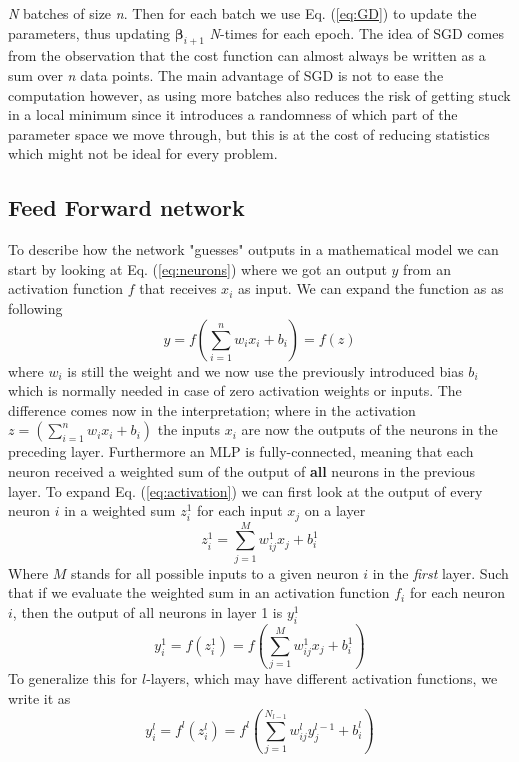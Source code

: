 \documentclass[14pt, a4paper]{book}
\begin{document}
\textit{N} batches of size \textit{n}. Then for each batch we use Eq. (\ref{eq:GD}) to update the parameters, thus updating $\bm{\beta}_{i+1}$ \textit{N}-times for each epoch. The idea of SGD comes from the observation that the 
cost function can almost always be written as a sum over \textit{n} data points. The main advantage of SGD is not to ease the computation however, as using more batches also reduces the risk of getting stuck in a local minimum since it introduces a randomness of which part of the parameter space we move through, 
but this is at the cost of reducing statistics which might not be ideal for every problem.


\subsection{Feed Forward network}\label{sec:FFN}
To describe how the network "guesses" outputs in a mathematical model we can start by looking at Eq. (\ref{eq:neurons}) where we got an output $y$ from an activation function $f$ that receives $x_i$ as input. 
We can expand the function as as following
\begin{equation}\label{eq:activation}
    y=f\left(\sum_{i=1}^nw_ix_i+b_i\right)=f(z)
\end{equation} 
where $w_i$ is still the weight and we now use the previously introduced bias $b_i$ which is normally needed in case of zero activation weights or inputs. The difference comes now in the interpretation; where in the activation 
$z=(\sum_{i=1}^nw_ix_i+b_i)$ the inputs $x_i$ are now the outputs of the neurons in the preceding layer. Furthermore an MLP is fully-connected, meaning that each neuron received a weighted sum of the output of \textbf{all} 
neurons in the previous layer. To expand Eq. (\ref{eq:activation}) we can first look at the output of every neuron $i$ in a weighted sum $z^1_i$ for each input $x_j$ on a layer
\begin{equation}\label{eq:weightedsum}
    z_i^1=\sum_{j=1}^Mw_{ij}^1x_j + b^1_i
\end{equation}
Where $M$ stands for all possible inputs to a given neuron $i$ in the \textit{first} layer. Such that if we evaluate the weighted sum in an activation function $f_i$ for each neuron $i$, 
then the output of all neurons in layer 1 is $y_i^1$
$$
    y^1_i=f(z_i^1)=f\left(\sum_{j=1}^Mw_{ij}^1x_j + b^1_i\right)
$$
To generalize this for $l$-layers, which may have different activation functions, we write it as
$$
    y^l_i=f^l(z_i^l)=f^l\left(\sum_{j=1}^{N_{l-1}}w_{ij}^ly^{l-1}_j + b^l_i\right)
$$
\end{document}
